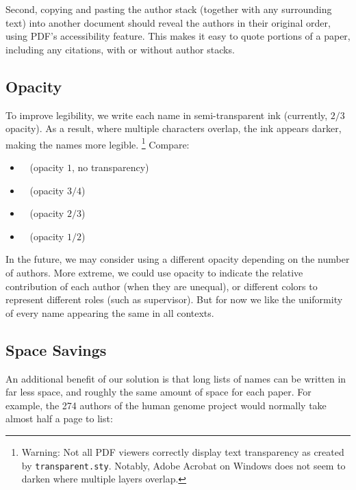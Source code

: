 \documentclass[natbib,authoryear]{sigtbd17-style}
\begin{document}
Second, copying and pasting the author stack (together with any surrounding
text) into another document should reveal the authors in their original order,
using PDF's accessibility feature.  This makes it easy to quote portions of
a paper, including any citations, with or without author stacks.

\subsection{Opacity}

To improve legibility, we write each name in semi-transparent ink
(currently, $2/3$ opacity).
As a result, where multiple characters overlap, the ink appears darker,
making the names more legible.%
%
\footnote{Warning: Not all PDF viewers correctly display text transparency
  as created by \texttt{transparent.sty}.  Notably, Adobe Acrobat on Windows
  does not seem to darken where multiple layers overlap.}
%
Compare:
%
\begin{itemize}
\item {} ~ (opacity $1$, no transparency)
\item {} ~ (opacity $3/4$)
\item {} ~ (opacity $2/3$)
\item {} ~ (opacity $1/2$)
\end{itemize}
%
In the future, we may consider using a different opacity depending on the
number of authors.  More extreme, we could use opacity to indicate the
relative contribution of each author (when they are unequal), or different
colors to represent different roles (such as supervisor).
But for now we like the uniformity of every name
appearing the same in all contexts.

\subsection{Space Savings}

An additional benefit of our solution is that long lists of names can be
written in far less space, and roughly the same amount of space for each paper.
For example, the 274 authors of the human genome project \cite{human-genome}
would normally take almost half a page to list:
\end{document}
